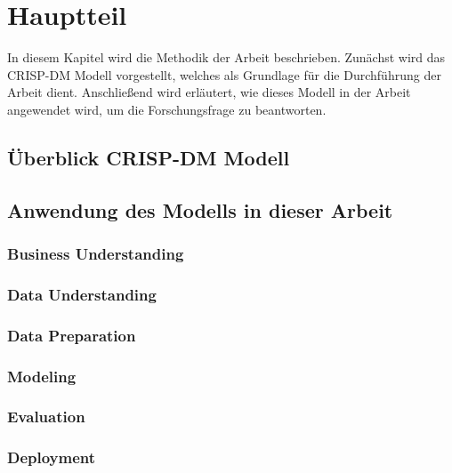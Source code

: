 \newpage

\section{Hauptteil} \label{Methodik}
In diesem Kapitel wird die Methodik der Arbeit beschrieben. Zunächst wird das CRISP-DM Modell vorgestellt, welches als Grundlage für die Durchführung der Arbeit dient. Anschließend wird erläutert, wie dieses Modell in der Arbeit angewendet wird, um die Forschungsfrage zu beantworten.

\subsection{Überblick CRISP-DM Modell} \label{ueberblickcrispdm}


\subsection{Anwendung des Modells in dieser Arbeit} \label{anwendungdesmodellsinderarbeit}


\subsubsection{Business Understanding} \label{businessunderstanding}


\subsubsection{Data Understanding} \label{dataunderstanding}


\subsubsection{Data Preparation} \label{datapreparation}


\subsubsection{Modeling} \label{modeling}


\subsubsection{Evaluation} \label{evaluation}


\subsubsection{Deployment} \label{deployment}

